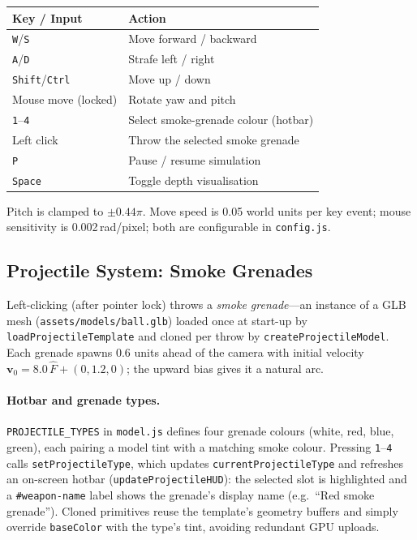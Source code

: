 \documentclass[a4paper, 12pt]{article}
\begin{document}
\begin{center}
\begin{tabular}{ll}
\toprule
\textbf{Key / Input} & \textbf{Action} \\
\midrule
\texttt{W}/\texttt{S}        & Move forward / backward \\
\texttt{A}/\texttt{D}        & Strafe left / right \\
\texttt{Shift}/\texttt{Ctrl} & Move up / down \\
Mouse move (locked)          & Rotate yaw and pitch \\
\texttt{1}--\texttt{4}       & Select smoke-grenade colour (hotbar) \\
Left click                   & Throw the selected smoke grenade \\
\texttt{P}                   & Pause / resume simulation \\
\texttt{Space}               & Toggle depth visualisation \\
\bottomrule
\end{tabular}
\end{center}

Pitch is clamped to $\pm0.44\pi$.
Move speed is 0.05 world units per key event; mouse sensitivity is
0.002\,rad/pixel; both are configurable in \texttt{config.js}.

\subsection{Projectile System: Smoke Grenades}

Left-clicking (after pointer lock) throws a \emph{smoke grenade}—an instance
of a GLB mesh (\texttt{assets/models/ball.glb}) loaded once at start-up by
\texttt{loadProjectileTemplate} and cloned per throw by
\texttt{createProjectileModel}.
Each grenade spawns 0.6 units ahead of the camera with initial velocity
$\mathbf{v}_0 = 8.0\,\hat{F} + (0,1.2,0)$; the upward bias gives it a
natural arc.

\paragraph{Hotbar and grenade types.}
\texttt{PROJECTILE\_TYPES} in \texttt{model.js} defines four grenade colours
(white, red, blue, green), each pairing a model tint with a matching smoke
colour.
Pressing \texttt{1}–\texttt{4} calls \texttt{setProjectileType}, which updates
\texttt{currentProjectileType} and refreshes an on-screen hotbar
(\texttt{updateProjectileHUD}): the selected slot is highlighted and a
\texttt{\#weapon-name} label shows the grenade's display name (e.g.\ ``Red
smoke grenade'').
Cloned primitives reuse the template's geometry buffers and simply override
\texttt{baseColor} with the type's tint, avoiding redundant GPU uploads.
\end{document}
